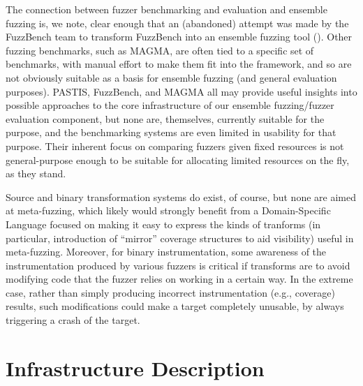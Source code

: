 The connection between fuzzer 
benchmarking and evaluation and ensemble fuzzing is, we note, clear enough that 
an (abandoned) attempt was made by the FuzzBench team to transform FuzzBench 
into an ensemble fuzzing tool (\url{}).   Other fuzzing benchmarks, such as 
MAGMA, are often tied to a specific set of benchmarks, with manual effort to 
make them fit into the framework, and so are not obviously suitable as a basis 
for ensemble fuzzing (and general evaluation purposes).  PASTIS, FuzzBench, and 
MAGMA all may provide useful insights into possible approaches to the core 
infrastructure of our ensemble fuzzing/fuzzer evaluation component, but none 
are, themselves, currently suitable for the purpose, and the benchmarking 
systems are even limited in usability for that purpose.   Their
inherent focus on comparing fuzzers given fixed resources is not
general-purpose enough to be suitable for allocating limited resources
on the fly, as they stand.


Source and binary transformation systems do exist, of course, but none are 
aimed at meta-fuzzing, which likely would strongly benefit from a 
Domain-Specific Language focused on making it easy to express the kinds of 
tranforms (in particular, introduction of ``mirror'' coverage structures to aid 
visibility) useful in meta-fuzzing.  Moreover, for binary instrumentation, some 
awareness of the instrumentation produced by various fuzzers is critical if 
transforms are to avoid modifying code that the fuzzer relies on working in a 
certain way.  In the extreme case, rather than simply producing incorrect 
instrumentation (e.g., coverage) results, such modifications could make a 
target completely unusable, by always triggering a crash of the target.

\section{Infrastructure Description}

